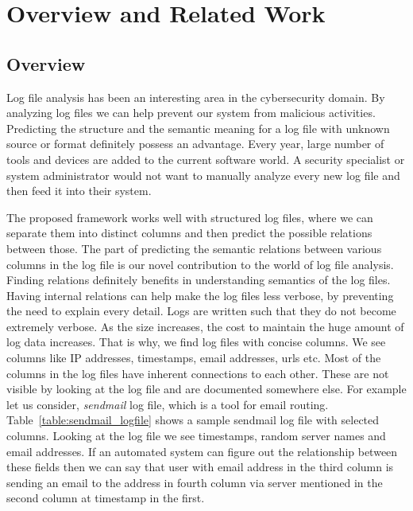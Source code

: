 \chapter{Overview and Related Work}
\thispagestyle{plain}
\label{Overview}


\section{Overview}
Log file analysis has been an interesting area in the cybersecurity domain. By analyzing log files we can help prevent our system from malicious activities. Predicting the structure and the semantic meaning for a log file with unknown source or format definitely possess an advantage. Every year, large number of tools and devices are added to the current software world. A security specialist or system administrator would not want to manually analyze every new log file and then feed it into their system. 

The proposed framework works well with structured log files, where we can separate them into distinct columns and then predict the possible relations between those. The part of predicting the semantic relations between various columns in the log file is our novel contribution to the world of log file analysis. Finding relations definitely benefits in understanding semantics of the log files. Having internal relations can help make the log files less verbose, by preventing the need to explain every detail. Logs are written such that they do not become extremely verbose. As the size increases, the cost to maintain the huge amount of log data increases. That is why, we find log files with concise columns. We see columns like IP addresses, timestamps, email addresses, urls etc. Most of the columns in the log files have inherent connections to each other. These are not visible by looking at the log file and are documented somewhere else. For example let us consider, \textit{sendmail} log file, which is a tool for email routing. Table~\ref{table:sendmail_logfile} shows a sample sendmail log file with selected columns. Looking at the log file we see timestamps, random server names and email addresses. If an automated system can figure out the relationship between these fields then we can say that user with email address in the third column is sending an email to the address in fourth column via server mentioned in the second column at timestamp in the first.


